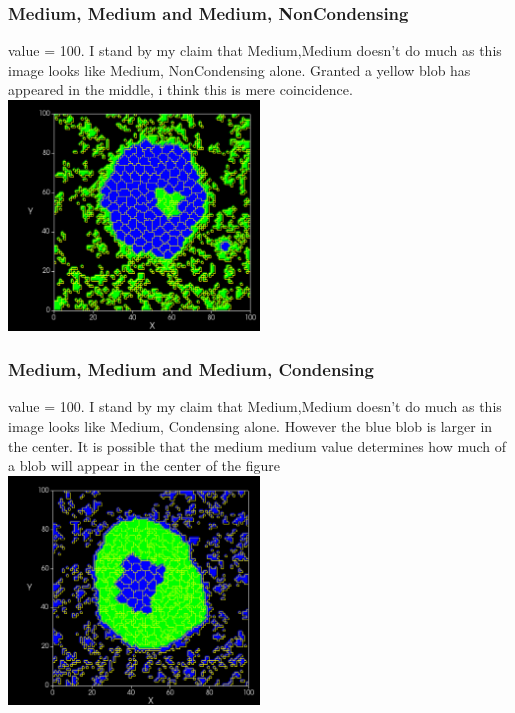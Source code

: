 \documentclass{article}
\begin{document}
\subsubsection{Medium, Medium and Medium, NonCondensing}
value = 100.  I stand by my claim that Medium,Medium doesn't do much as this image looks like Medium, NonCondensing alone.  Granted a yellow blob has appeared in the middle, i think this is mere coincidence.
    \includegraphics[width=0.5\textwidth]{mm_mnC100}
    
\subsubsection{Medium, Medium and Medium, Condensing}
value = 100.  I stand by my claim that Medium,Medium doesn't do much as this image looks like Medium, Condensing alone.  However the blue blob is larger in the center.  It is possible that the medium medium value determines how much of a blob will appear in the center of the figure
    \includegraphics[width=0.5\textwidth]{mm_mc100}
\end{document}
